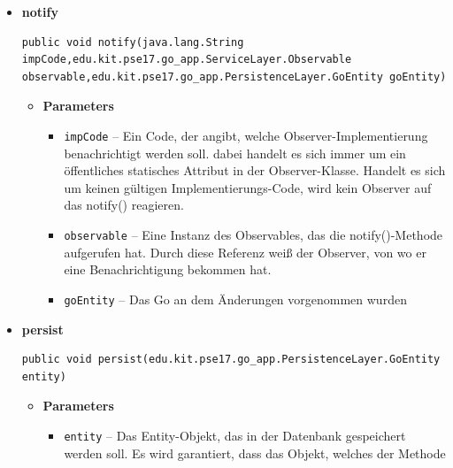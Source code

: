 \documentclass[11pt,a4paper]{article}
\begin{document}
{{{{{{{{{{{{{\begin{itemize}
{\begin{itemize}
{}%
\end{itemize}
}%
\item{ 
\hypertarget{edu.kit.pse17.go_app.PersistenceLayer.daos.GoDaoImp.notify(java.lang.String, edu.kit.pse17.go_app.ServiceLayer.Observable, edu.kit.pse17.go_app.PersistenceLayer.GoEntity)}{{\bf  notify}\\}
\begin{lstlisting}[frame=none]
public void notify(java.lang.String impCode,edu.kit.pse17.go_app.ServiceLayer.Observable observable,edu.kit.pse17.go_app.PersistenceLayer.GoEntity goEntity)\end{lstlisting} %
\begin{itemize}
\item{
{\bf  Parameters}
  \begin{itemize}
   \item{
\texttt{impCode} -- Ein Code, der angibt, welche Observer-Implementierung benachrichtigt werden soll. dabei handelt es sich immer um ein öffentliches statisches Attribut in der Observer-Klasse. Handelt es sich um keinen gültigen Implementierungs-Code, wird kein Observer auf das notify() reagieren.}
   \item{
\texttt{observable} -- Eine Instanz des Observables, das die notify()-Methode aufgerufen hat. Durch diese Referenz weiß der Observer, von wo er eine Benachrichtigung bekommen hat.}
   \item{
\texttt{goEntity} -- Das Go an dem Änderungen vorgenommen wurden}
  \end{itemize}
}%
\end{itemize}
}%
\item{ 
\hypertarget{edu.kit.pse17.go_app.PersistenceLayer.daos.GoDaoImp.persist(edu.kit.pse17.go_app.PersistenceLayer.GoEntity)}{{\bf  persist}\\}
\begin{lstlisting}[frame=none]
public void persist(edu.kit.pse17.go_app.PersistenceLayer.GoEntity entity)\end{lstlisting} %
\begin{itemize}
\item{
{\bf  Parameters}
  \begin{itemize}
   \item{
\texttt{entity} -- Das Entity-Objekt, das in der Datenbank gespeichert werden soll. Es wird garantiert, dass das Objekt, welches der Methode}
  \end{itemize}
}
\end{itemize}}
\end{itemize}}}}}}}}}}}}}}
\end{document}
